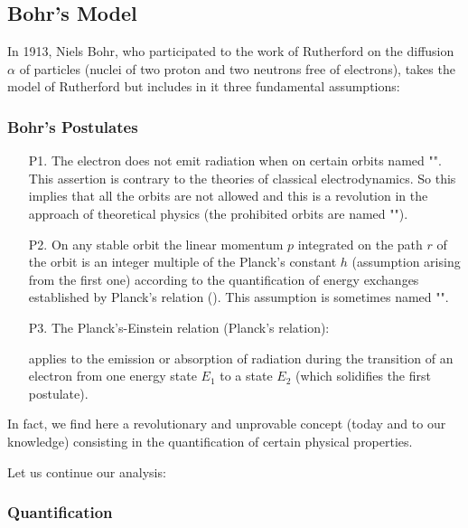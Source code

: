 \subsection{Bohr's Model}\label{bohr model}

In 1913, Niels Bohr, who participated to the work of Rutherford on the diffusion $\alpha$ of particles (nuclei of two proton and two neutrons free of electrons), takes the model of Rutherford but includes in it three fundamental assumptions:

\subsubsection{Bohr's Postulates}\label{bohr postulates}

	\begin{enumerate}
		\item[P1.] The electron does not emit radiation when on certain orbits named "". This assertion is contrary to the theories of classical electrodynamics. So this implies that all the orbits are not allowed and this is a revolution in the approach of theoretical physics (the prohibited orbits are named "").
		
		\item[P2.] On any stable orbit the linear momentum  $p$ integrated on the path $r$ of the orbit is an integer multiple of the Planck's constant $h$ (assumption arising from the first one) according to the quantification of energy exchanges established by Planck's relation (). This assumption is sometimes named "".
		
		\item[P3.] The Planck's-Einstein relation (Planck's relation):
			
applies to the emission or absorption of radiation during the transition of an electron from one energy state $E_1$ to a state $E_2$ (which solidifies the first postulate).		
	\end{enumerate}
In fact, we find here a revolutionary and unprovable concept (today and to our knowledge) consisting in the quantification of certain physical properties.

Let us continue our analysis:

\subsubsection{Quantification}\label{quantification}

